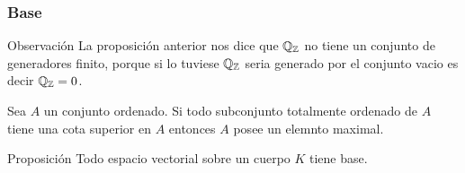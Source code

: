 \documentclass[notes=show]{beamer}%
\providecommand{\U}[1]{\protect\rule{.1in}{.1in}}
\newenvironment{Propo}{\begin{block}{Proposición}}{\end{block}}
\newenvironment{Ob}{\begin{block}{Observación}}{\end{block}}
\begin{document}
\begin{frame}%


\bigskip%
\frametitle{Base}%


\begin{Ob}
\bigskip La proposición anterior nos dice que $%
\mathbb{Q}
_{%
\mathbb{Z}
}$ no tiene un conjunto de generadores finito, porque si lo tuviese $%
\mathbb{Q}
_{%
\mathbb{Z}
}$ seria generado por el conjunto vacio es decir $%
\mathbb{Q}
_{%
\mathbb{Z}
}=0$.
\end{Ob}

\begin{lemma}
Sea $A$ un conjunto ordenado. Si todo subconjunto totalmente
ordenado de $A$ tiene una cota superior en $A$ entonces $A$ posee un elemnto maximal.
\end{lemma}

\begin{Propo}
Todo espacio vectorial sobre un cuerpo $K$ tiene base.
\end{Propo}

\bigskip%

\transboxout
\end{frame}%


\bigskip%
\end{document}
